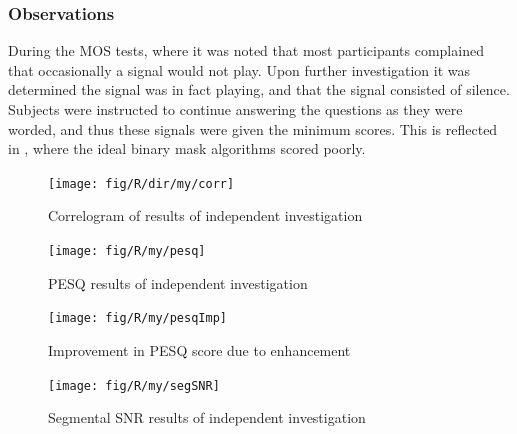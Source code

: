 \subsubsection*{Observations}

During the \ac{MOS} tests, where it was noted that most participants
complained that occasionally a signal would not play. Upon further
investigation it was determined the signal was in fact playing, and
that the signal consisted of silence. Subjects were instructed to
continue answering the questions as they were worded, and thus these
signals were given the minimum scores. This is reflected in ,
where the ideal binary mask algorithms scored poorly.

\begin{figure}[h]
\noindent \begin{centering}
\texttt{[image: fig/R/dir/my/corr]}
\par\end{centering}

\protect\caption{\label{fig:my-Corr}Correlogram of results of independent investigation}
\end{figure}


\begin{figure}[p]
\noindent \begin{centering}
\texttt{[image: fig/R/my/pesq]}
\par\end{centering}

\protect\caption{\label{fig:my-PESQ}\acs{PESQ} results of independent investigation}
\end{figure}


\begin{figure}[p]
\noindent \begin{centering}
\texttt{[image: fig/R/my/pesqImp]}
\par\end{centering}

\protect\caption{\label{fig:my-PESQ-imp}Improvement in \acs{PESQ} score due to enhancement}
\end{figure}


\begin{figure}[h]
\noindent \begin{centering}
\texttt{[image: fig/R/my/segSNR]}
\par\end{centering}

\protect\caption{\label{fig:my-segSNR}Segmental \acs{SNR} results of independent
investigation}
\end{figure}


